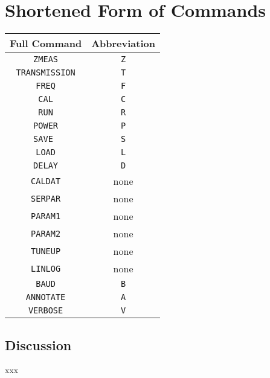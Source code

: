 \section{Shortened Form of Commands}
\begin{center}
\begin{tabular}{|c||c|} \hline
\textbf{Full Command}   &  \textbf{Abbreviation}  \\ \hline \hline
\texttt{ZMEAS}    &   \texttt{Z} \\ \hline
\texttt{TRANSMISSION}   &   \texttt{T} \\ \hline
\texttt{FREQ}   &   \texttt{F} \\ \hline
\texttt{CAL}   &   \texttt{C} \\ \hline
\texttt{RUN}   &  \texttt{R} \\ \hline
\texttt{POWER}    &  \texttt{P}  \\ \hline
\texttt{SAVE }   &   \texttt{S}  \\ \hline
\texttt{LOAD}    &   \texttt{L}  \\ \hline
\texttt{DELAY}    &   \texttt{D}  \\ \hline
\texttt{CALDAT}   &    none \\ \hline
\texttt{SERPAR}   &   none   \\ \hline
\texttt{PARAM1}   &   none  \\ \hline
\texttt{PARAM2}   &   none  \\ \hline
\texttt{TUNEUP}   &   none  \\ \hline
\texttt{LINLOG}    &    none  \\ \hline
\texttt{BAUD}        &   \texttt{B}  \\ \hline
\texttt{ANNOTATE}   &   \texttt{A}  \\ \hline
\texttt{VERBOSE}     &   \texttt{V}  \\ \hline

\end{tabular}
\end{center}

\subsection{Discussion}
xxx

